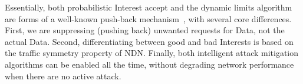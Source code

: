 Essentially, both probabilistic Interest accept and the dynamic limits algorithm are forms of a well-known push-back mechanism~\cite{Pushback}, with several core differences.
First, we are suppressing (pushing back) unwanted requests for Data, not the actual Data.
Second, differentiating between good and bad Interests is based on the traffic symmetry property of NDN.
Finally, both intelligent attack mitigation algorithms can be enabled all the time, without degrading network performance when there are no active attack.


